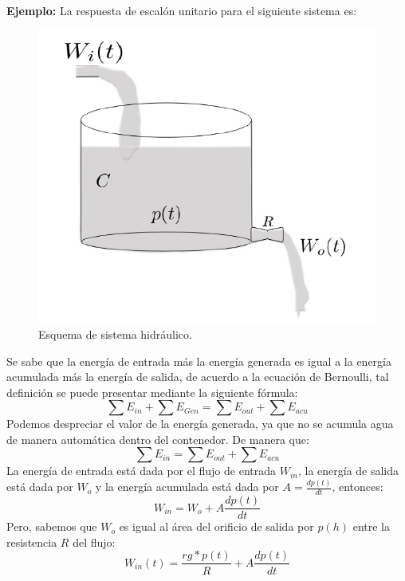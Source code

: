 \documentclass[letterpaper]{article}
\begin{document}
	\newpage
	\textbf{Ejemplo:}
	La respuesta de escalón unitario para el siguiente sistema es:	
	\begin{figure}[h!]
		\centering
		\includegraphics[scale=.75]{tank}
		\caption{Esquema de sistema hidráulico.}
	\end{figure}
	\FloatBarrier
	Se sabe que la energía de entrada más la energía generada es igual a la energía acumulada más la energía de salida, de acuerdo a la ecuación de Bernoulli, tal definición se puede presentar mediante la siguiente fórmula:
	\begin{equation}
	\sum E_{in} + \sum E_{Gen} = \sum E_{out} + \sum E_{acu}
	\end{equation}
	Podemos despreciar el valor de la energía generada, ya que no se acumula agua de manera automática dentro del contenedor. De manera que:
	\begin{equation}
	\sum E_{in} = \sum E_{out} + \sum E_{acu}
	\end{equation}
	 La energía de entrada está dada por el flujo de entrada $ W_{in} $, la energía de salida está dada por $ W_o $ y la energía acumulada está dada por $ A=\frac {dp(t)}{dt} $, entonces:
	 \begin{equation}
	 W_{in}=W_o + A\frac{dp(t)}{dt}
	 \end{equation} 
	 Pero, sabemos que $ W_o $ es igual al área del orificio de salida por $ p(h) $ entre la resistencia $ R $ del flujo:
	 \begin{equation}
	 W_{in}(t)=\frac{rg*p(t)}{R}+A\frac{dp(t)}{dt}
	 \end{equation}
	 
\end{document}
